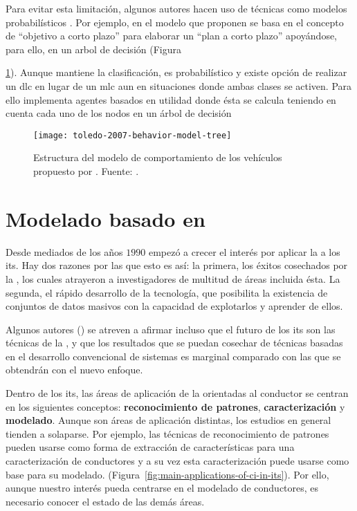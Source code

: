 Para evitar esta limitación, algunos autores hacen uso de técnicas como modelos probabilísticos \cite{Toledo2003, Toledo2007, Wei2000}. Por ejemplo, en \cite{Toledo2007} el modelo que proponen se basa en el concepto de \enquote{objetivo a corto plazo} para elaborar un \enquote{plan a corto plazo} apoyándose, para ello, en un arbol de decisión (Figura{\ref{fig:toledo-2007-behavior-model-tree}). Aunque mantiene la clasificación, es probabilístico y existe opción de realizar un \Acrshort{dlc} en lugar de un \Acrshort{mlc} aun en situaciones donde ambas clases se activen. Para ello implementa agentes basados en utilidad donde ésta se calcula teniendo en cuenta cada uno de los nodos en un árbol de decisión

\begin{figure}
	\texttt{[image: toledo-2007-behavior-model-tree]}
	\caption[Estructura del modelo de comportamiento propuesto por \cite{Toledo2007}]{Estructura del modelo de comportamiento de los vehículos propuesto por \cite{Toledo2007}. Fuente: \cite{Toledo2007}.}
	\label{fig:toledo-2007-behavior-model-tree}
\end{figure}

\section{Modelado basado en }

Desde mediados de los años $1990$ empezó a crecer el interés por aplicar la  a los \acrshort{its}. Hay dos razones por las que esto es así: la primera, los éxitos cosechados por la , los cuales atrayeron a investigadores de multitud de áreas incluida ésta. La segunda, el rápido desarrollo de la tecnología, que posibilita la existencia de conjuntos de datos masivos con la capacidad de explotarlos y aprender de ellos.

Algunos autores (\cite{Zhang2011}) se atreven a afirmar incluso que el futuro de los \acrshort{its} son las técnicas de la , y que los resultados que se puedan cosechar de técnicas basadas en el desarrollo convencional de sistemas es marginal comparado con las que se obtendrán con el nuevo enfoque.

Dentro de los \acrshort{its}, las áreas de aplicación de la  orientadas al conductor se centran en los siguientes conceptos: \textbf{reconocimiento de patrones}, \textbf{caracterización} y \textbf{modelado}. Aunque son áreas de aplicación distintas, los estudios en general tienden a solaparse. Por ejemplo, las técnicas de reconocimiento de patrones pueden usarse como forma de extracción de características para una caracterización de conductores y a su vez esta caracterización puede usarse como base para su modelado. (Figura~\ref{fig:main-applications-of-ci-in-its}). Por ello, aunque nuestro interés pueda centrarse en el modelado de conductores, es necesario conocer el estado de las demás áreas.

}
